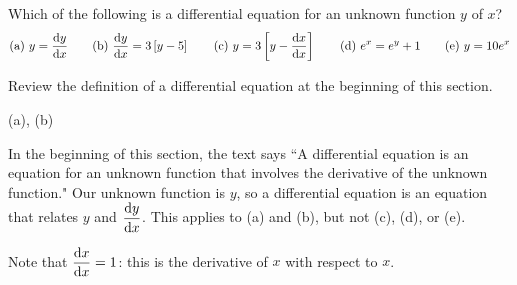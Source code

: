%
%

\subsection*{\Conceptual}


\begin{question}
Which of the following is a differential equation for an unknown function $y$ of $x$?
\[\mbox{(a) } y=\diff{y}{x}
\qquad\mbox{(b) } \diff{y}{x}=3\left[y-5\right]
\qquad\mbox{(c) } y=3\left[y-\diff{x}{x}\right]
\qquad\mbox{(d) } e^x=e^y+1
\qquad\mbox{(e) } y=10e^x\]
\end{question}
\begin{hint}
Review the definition of a differential equation at the beginning of this section.
\end{hint}
\begin{answer} (a), (b)
\end{answer}
\begin{solution}
In the beginning of this section, the text says ``A differential equation is an equation for an unknown function that involves the derivative
of the unknown function." Our unknown function is $y$, so a differential equation is an equation that relates $y$ and $\ds\diff{y}{x}$. This applies to (a) and (b), but not (c), (d), or (e).

Note that $\ds\diff{x}{x}=1$: this is the derivative of $x$ with respect to $x$.
\end{solution}



